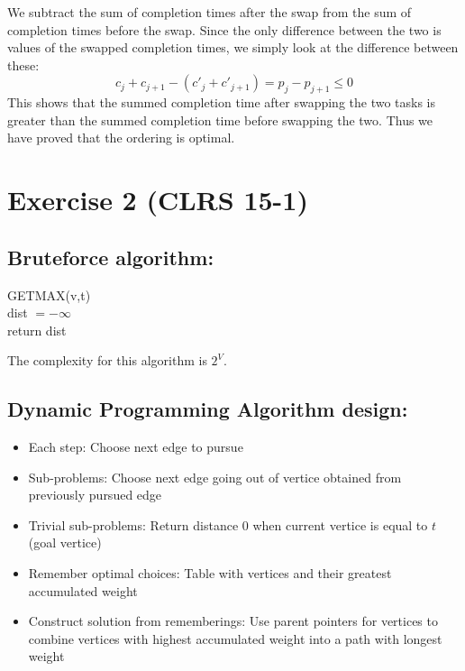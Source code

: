 We subtract the sum of completion times after the swap from the sum of completion times before the swap.
Since the only difference between the two is values of the swapped completion times, we simply look at the difference between these:
$$c_j + c_{j+1} - (c'_j + c'_{j+1})= p_j - p_{j + 1} \leq 0$$
This shows that the summed completion time after swapping the two tasks is greater than the summed completion time before swapping the two.
Thus we have proved that the ordering is optimal.

\section*{Exercise 2 (CLRS 15-1)}

\subsection*{Bruteforce algorithm:}

\begin{algorithm}[H]
GETMAX(v,t)
\\
dist $= -\infty$\\
return dist
\end{algorithm}
The complexity for this algorithm is $2^V$.

\subsection*{Dynamic Programming Algorithm design:}

\begin{itemize}
\item{Each step: Choose next edge to pursue}
\item{Sub-problems: Choose next edge going out of vertice obtained from previously pursued edge}
\item{Trivial sub-problems: Return distance 0 when current vertice is equal to $t$ (goal vertice)}
\item{Remember optimal choices: Table with vertices and their greatest accumulated weight}
\item{Construct solution from rememberings: Use parent pointers for vertices to combine vertices with highest accumulated weight into a path with longest weight}
\end{itemize}

